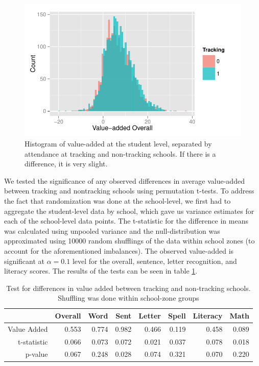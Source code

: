 \documentclass[11pt]{article}
\begin{document}
  \begin{figure}[H]
  	\centering
  	\includegraphics[scale=0.8]{../Figures/Value-AddedHist.pdf}
  	\caption{Histogram of value-added at the student level, separated by attendance at tracking and non-tracking schools.  If there is a difference, it is very slight.}
  	\label{fig:va-hist}
  \end{figure} 

We tested the significance of any observed differences in average value-added between tracking and nontracking schools using permutation t-tests.  To address the fact that randomization was done at the school-level, we first had to aggregate the student-level data by school, which gave us variance estimates for each of the school-level data points.  The t-statistic for the difference in means was calculated using unpooled variance and the null-distribution was approximated using 10000 random shufflings of the data within school zones (to account for the aforementioned imbalances).  The observed value-added is significant at $ \alpha = 0.1 $ level for the overall, sentence, letter recognition, and literacy scores. The results of the tests can be seen in table \ref{tab:tracking_va}.

\begin{table}[ht]
	\centering
	\begin{tabular}{rrrrrrrr}
		\hline
		& Overall & Word & Sent & Letter & Spell & Literacy & Math \\ 
		\hline
		Value Added & 0.553 & 0.774 & 0.982 & 0.466 & 0.119 & 0.458 & 0.089 \\ 
		t-statistic & 0.066 & 0.073 & 0.072 & 0.021 & 0.037 & 0.078 & 0.018 \\ 
		p-value & 0.067 & 0.248 & 0.028 & 0.074 & 0.321 & 0.070 & 0.220 \\ 
		\hline
	\end{tabular}
	\caption{Test for differences in value added between tracking and non-tracking schools.  
		Shuffling was done within school-zone groups}
	\label{tab:tracking_va}
\end{table}
\end{document}
